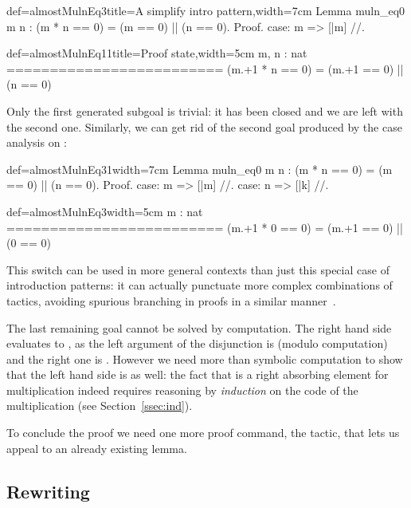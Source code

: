 \begin{coq}{def=almostMulnEq3}{title=A simplify intro pattern,width=7cm}
Lemma muln_eq0 m n :
  (m * n == 0) = (m == 0) || (n == 0).
Proof.
case: m => [|m] //.
\end{coq}
\begin{coqout}{def=almostMulnEq11}{title=Proof state,width=5cm}
m, n : nat
=========================
(m.+1 * n == 0) =
  (m.+1 == 0) || (n == 0)
\end{coqout}

Only the first generated subgoal is trivial: it has been closed and
we are left with the second one. Similarly, we can get rid of the
second goal produced by the case analysis on :

\begin{coq}{def=almostMulnEq31}{width=7cm}
Lemma muln_eq0 m n :
  (m * n == 0) = (m == 0) || (n == 0).
Proof.
case: m => [|m] //.
case: n => [|k] //.
\end{coq}
\begin{coqout}{def=almostMulnEq3}{width=5cm}
m : nat
=========================
(m.+1 * 0 == 0) =
  (m.+1 == 0) || (0 == 0)
\end{coqout}

This \C{//} switch can be used in
more general contexts than just this special case of introduction patterns:
it can actually punctuate more complex combinations of tactics,
avoiding spurious branching in proofs in a similar
manner~\cite[section 5.4]{ssrman}.

The last remaining goal cannot be solved by computation.
The right hand side evaluates to
, as the left argument of the disjunction is  (modulo
computation) and the right one is . However we need
more than symbolic computation to show that the left hand side is
 as well: the fact that  is a right absorbing element for
multiplication indeed requires reasoning by \emph{induction} on the
code of the multiplication (see Section~\ref{ssec:ind}).

To conclude the proof we need one more proof command, the
 tactic, that lets us appeal to an already existing lemma.


\subsection{Rewriting}\label{ssec:rw}

